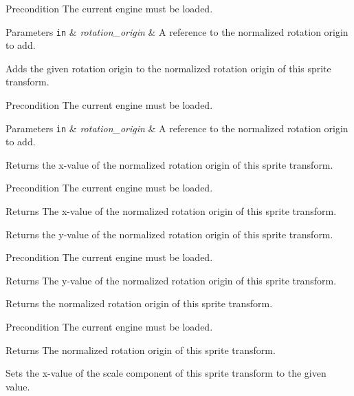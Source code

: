 \begin{DoxyPrecond}{Precondition}
The current engine must be loaded. 
\end{DoxyPrecond}

\begin{DoxyParams}[1]{Parameters}
\mbox{\tt in}  & {\em rotation\+\_\+origin} & A reference to the normalized rotation origin to add.\\
\hline
\end{DoxyParams}
Adds the given rotation origin to the normalized rotation origin of this sprite transform.

\begin{DoxyPrecond}{Precondition}
The current engine must be loaded. 
\end{DoxyPrecond}

\begin{DoxyParams}[1]{Parameters}
\mbox{\tt in}  & {\em rotation\+\_\+origin} & A reference to the normalized rotation origin to add.\\
\hline
\end{DoxyParams}
Returns the x-\/value of the normalized rotation origin of this sprite transform.

\begin{DoxyPrecond}{Precondition}
The current engine must be loaded. 
\end{DoxyPrecond}
\begin{DoxyReturn}{Returns}
The x-\/value of the normalized rotation origin of this sprite transform.
\end{DoxyReturn}
Returns the y-\/value of the normalized rotation origin of this sprite transform.

\begin{DoxyPrecond}{Precondition}
The current engine must be loaded. 
\end{DoxyPrecond}
\begin{DoxyReturn}{Returns}
The y-\/value of the normalized rotation origin of this sprite transform.
\end{DoxyReturn}
Returns the normalized rotation origin of this sprite transform.

\begin{DoxyPrecond}{Precondition}
The current engine must be loaded. 
\end{DoxyPrecond}
\begin{DoxyReturn}{Returns}
The normalized rotation origin of this sprite transform.
\end{DoxyReturn}
Sets the x-\/value of the scale component of this sprite transform to the given value.



